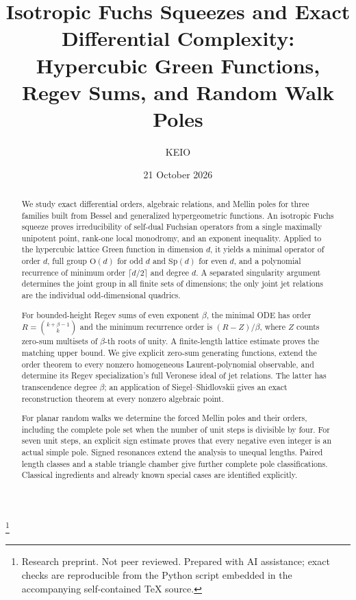 \documentclass[11pt]{amsart}
\theoremstyle{definition}
\newcommand{\Sp}{\mathrm{Sp}}
\newcommand{\Ort}{\mathrm{O}}
\begin{document}
\title[Isotropic squeezes and exact differential complexity]{Isotropic Fuchs Squeezes and Exact Differential Complexity:\\Hypercubic Green Functions, Regev Sums, and Random Walk Poles}

\author{KEIO}\date{21 October 2026}
\thanks{Research preprint. Not peer reviewed. Prepared with AI assistance; exact checks are reproducible from the Python script embedded in the accompanying self-contained TeX source.}


\begin{abstract}
We study exact differential orders, algebraic relations, and Mellin poles
for three families built from Bessel and generalized hypergeometric functions.
An isotropic Fuchs squeeze proves irreducibility of self-dual Fuchsian
operators from a single maximally unipotent point, rank-one local monodromy,
and an exponent inequality.  Applied to the hypercubic lattice Green
function in dimension $d$, it yields a minimal operator of order $d$,
full group $\Ort(d)$ for odd $d$ and $\Sp(d)$ for even $d$, and a
polynomial recurrence of minimum order $\lceil d/2\rceil$ and degree $d$.
A separated singularity argument determines the joint group in all
finite sets of dimensions; the only joint jet relations are the
individual odd-dimensional quadrics.

For bounded-height Regev sums of even exponent $\beta$, the minimal
ODE has order $R=\binom{k+\beta-1}{k}$ and the minimum recurrence order is
$(R-Z)/\beta$, where $Z$ counts zero-sum multisets of $\beta$-th roots
of unity.  A finite-length lattice estimate proves the matching upper
bound.  We give explicit zero-sum generating functions, extend the
order theorem to every nonzero homogeneous Laurent-polynomial observable,
and determine its Regev specialization's full Veronese ideal of jet
relations.  The latter has transcendence degree $\beta$; an application
of Siegel--Shidlovskii gives an exact reconstruction theorem at every
nonzero algebraic point.

For planar random walks we determine the forced Mellin poles and their
orders, including the complete pole set when the number of unit steps
is divisible by four. For seven unit steps, an explicit sign estimate
proves that every negative even integer is an actual simple pole.  Signed resonances extend the analysis to unequal
lengths.  Paired length classes and a stable triangle chamber give further
complete pole classifications.  Classical ingredients and already known
special cases are identified explicitly.
\end{abstract}
\end{document}
